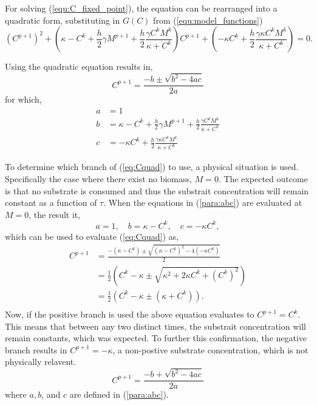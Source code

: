 For solving (\ref{equ:C_fixed_point}), the equation can be rearranged into a quadratic form, substituting in $G(C)$ from (\ref{equ:model_functions})
\begin{equation}
  \left(C^{p+1}\right)^2 + \left( \kappa - C^k + \frac{h}{2} \gamma M^{p+1} + \frac{h}{2} \frac{ \gamma C^k M^k}{\kappa + C^k} \right) C^{p+1} + \left( -\kappa C^k + \frac{h}{2} \frac{\gamma \kappa C^k M^k}{\kappa + C^k} \right) = 0.
\end{equation}

Using the quadratic equation results in, 
  \begin{equation} \label{eq:Cquad}
    C^{p+1} = \frac{-b \pm \sqrt{b^2 - 4ac}}{2a}
  \end{equation}  
  for which, 
  \begin{equation} \begin{aligned} \label{para:abc}
    a &= 1\\
    b &= \kappa - C^k + \frac{h}{2} \gamma M^{p+1} + \frac{h}{2} \frac{\gamma C^k M^k}{\kappa + C^k} \\
    c &= -\kappa C^k + \frac{h}{2} \frac{\gamma \kappa C^k M^k}{\kappa + C^k}
  \end{aligned}  \end{equation}
  
  To determine which branch of (\ref{eq:Cquad}) to use, a physical situation is used. 
  Specifically the case where there exist no biomass, $M = 0$. 
  The expected outcome is that no substrate is consumed and thus the substrait concentration will remain constant as a function of $\tau$. 
  When the equations in (\ref{para:abc}) are evaluated at $M = 0$, the result it,
  \begin{equation}
    a = 1, \quad b = \kappa - C^k, \quad c = -\kappa C^k,
  \end{equation} 
  which can be used to evaluate (\ref{eq:Cquad}) as,
  \begin{equation} \begin{aligned}
    C^{p+1} &= \frac{- (\kappa - C^k) \pm \sqrt{(\kappa - C^k)^2 - 4 (-\kappa C^k)}}{2} \\
      &= \frac{1}{2} \left( C^k - \kappa \pm \sqrt{\kappa^2 + 2 \kappa C^k + \left(C^k \right) ^2}\right) \\
      &= \frac{1}{2} \left( C^k - \kappa \pm (\kappa+C^k) \right). \\
  \end{aligned} \end{equation}
  Now, if the positive branch is used the above equation evaluates to $C^{p+1} = C^k$. 
  This means that between any two distinct times, the substrait concentration will remain constants, which was expected. 
  To further this confirmation, the negative branch results in $C^{p+1} = -\kappa $, a non-postive substrate concentration, which is not physically relavent. 
  \begin{equation}
    C^{p+1} = \frac{-b + \sqrt{b^2 - 4ac}}{2a}
  \end{equation} 
  where $a,b$, and $c$ are defined in (\ref{para:abc}).


